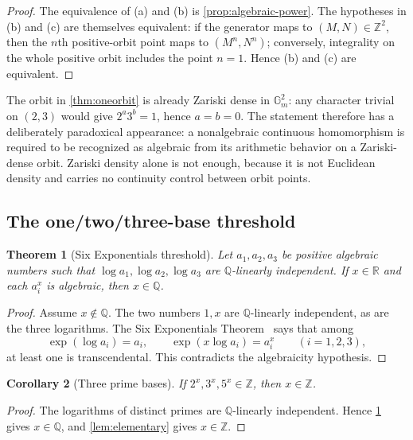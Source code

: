 \documentclass[11pt,oneside]{article}
\newtheorem{theorem}{Theorem}[section]
\newtheorem{corollary}[theorem]{Corollary}
\theoremstyle{definition}
\newcommand{\Q}{\mathbb{Q}}
\newcommand{\R}{\mathbb{R}}
\newcommand{\Z}{\mathbb{Z}}
\newcommand{\Gm}{\mathbb{G}_{m}}
\begin{document}
\begin{proof}
The equivalence of (a) and (b) is \cref{prop:algebraic-power}.  The hypotheses in (b) and (c) are themselves equivalent: if the generator maps to $(M,N)\in\Z^2$, then the $n$th positive-orbit point maps to $(M^n,N^n)$; conversely, integrality on the whole positive orbit includes the point $n=1$.  Hence (b) and (c) are equivalent.
\end{proof}

The orbit in \cref{thm:oneorbit} is already Zariski dense in $\Gm^2$: any character trivial on $(2,3)$ would give $2^a3^b=1$, hence $a=b=0$.  The statement therefore has a deliberately paradoxical appearance: a nonalgebraic continuous homomorphism is required to be recognized as algebraic from its arithmetic behavior on a Zariski-dense orbit.  Zariski density alone is not enough, because it is not Euclidean density and carries no continuity control between orbit points.

\subsection{The one/two/three-base threshold}

\begin{theorem}[Six Exponentials threshold]\label{thm:sixthreshold}
Let $a_1,a_2,a_3$ be positive algebraic numbers such that
$\log a_1,\log a_2,\log a_3$ are $\Q$-linearly independent.  If $x\in\R$ and each $a_i^x$ is algebraic, then $x\in\Q$.
\end{theorem}

\begin{proof}
Assume $x\notin\Q$.  The two numbers $1,x$ are $\Q$-linearly independent, as are the three logarithms.  The Six Exponentials Theorem~\cite{Waldschmidt2000,Waldschmidt2005} says that among
\[
    \exp(\log a_i)=a_i,
    \qquad
    \exp(x\log a_i)=a_i^x
    \qquad (i=1,2,3),
\]
at least one is transcendental.  This contradicts the algebraicity hypothesis.
\end{proof}

\begin{corollary}[Three prime bases]\label{cor:threeprime}
If $2^x,3^x,5^x\in\Z$, then $x\in\Z$.
\end{corollary}

\begin{proof}
The logarithms of distinct primes are $\Q$-linearly independent.  Hence \cref{thm:sixthreshold} gives $x\in\Q$, and \cref{lem:elementary} gives $x\in\Z$.
\end{proof}
\end{document}
